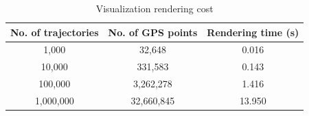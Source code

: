 \begin{table}
	\centering
	\small
	\caption{Visualization rendering cost}
	\begin{tabular}{|c|c|c|} \hline
		No. of trajectories & No. of GPS points & Rendering time (s) \\ \hline
		1,000& 32,648 & 0.016\\ \hline
		10,000& 331,583 & 0.143\\ \hline
		100,000& 3,262,278 & 1.416\\ \hline
		1,000,000& 32,660,845 & 13.950\\ \hline
	\end{tabular}	\label{tab:gpu}
\end{table}


